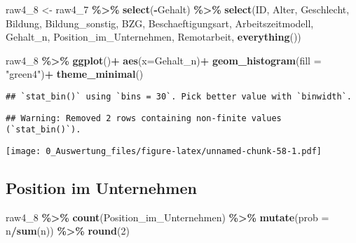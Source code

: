 \documentclass[
]{article}
\newenvironment{Shaded}{\begin{snugshade}}{\end{snugshade}}
\newcommand{\AttributeTok}[1]{\textcolor[rgb]{0.13,0.29,0.53}{#1}}
\newcommand{\DecValTok}[1]{\textcolor[rgb]{0.00,0.00,0.81}{#1}}
\newcommand{\FunctionTok}[1]{\textcolor[rgb]{0.13,0.29,0.53}{\textbf{#1}}}
\newcommand{\NormalTok}[1]{#1}
\newcommand{\OtherTok}[1]{\textcolor[rgb]{0.56,0.35,0.01}{#1}}
\newcommand{\SpecialCharTok}[1]{\textcolor[rgb]{0.81,0.36,0.00}{\textbf{#1}}}
\newcommand{\StringTok}[1]{\textcolor[rgb]{0.31,0.60,0.02}{#1}}
\begin{document}
\begin{Shaded}
\begin{Highlighting}[]
\NormalTok{raw4\_8 }\OtherTok{\textless{}{-}}\NormalTok{ raw4\_7 }\SpecialCharTok{\%\textgreater{}\%} 
  \FunctionTok{select}\NormalTok{(}\SpecialCharTok{{-}}\NormalTok{Gehalt) }\SpecialCharTok{\%\textgreater{}\%} 
  \FunctionTok{select}\NormalTok{(ID, Alter, Geschlecht, Bildung, Bildung\_sonstig, BZG, Beschaeftigungsart, Arbeitszeitmodell, Gehalt\_n, Position\_im\_Unternehmen, Remotarbeit, }\FunctionTok{everything}\NormalTok{())}
\end{Highlighting}
\end{Shaded}

\begin{Shaded}
\begin{Highlighting}[]
\NormalTok{raw4\_8 }\SpecialCharTok{\%\textgreater{}\%} 
  \FunctionTok{ggplot}\NormalTok{()}\SpecialCharTok{+}
  \FunctionTok{aes}\NormalTok{(}\AttributeTok{x=}\NormalTok{Gehalt\_n)}\SpecialCharTok{+}
  \FunctionTok{geom\_histogram}\NormalTok{(}\AttributeTok{fill =} \StringTok{"green4"}\NormalTok{)}\SpecialCharTok{+}
  \FunctionTok{theme\_minimal}\NormalTok{()}
\end{Highlighting}
\end{Shaded}

\begin{verbatim}
## `stat_bin()` using `bins = 30`. Pick better value with `binwidth`.
\end{verbatim}

\begin{verbatim}
## Warning: Removed 2 rows containing non-finite values (`stat_bin()`).
\end{verbatim}

\texttt{[image: 0\_Auswertung\_files/figure-latex/unnamed-chunk-58-1.pdf]}

\subsection{Position im Unternehmen}\label{position-im-unternehmen}

\begin{Shaded}
\begin{Highlighting}[]
\NormalTok{raw4\_8 }\SpecialCharTok{\%\textgreater{}\%} 
  \FunctionTok{count}\NormalTok{(Position\_im\_Unternehmen) }\SpecialCharTok{\%\textgreater{}\%} 
  \FunctionTok{mutate}\NormalTok{(}\AttributeTok{prob =}\NormalTok{ n}\SpecialCharTok{/}\FunctionTok{sum}\NormalTok{(n)) }\SpecialCharTok{\%\textgreater{}\%} 
  \FunctionTok{round}\NormalTok{(}\DecValTok{2}\NormalTok{)}
\end{Highlighting}
\end{Shaded}
\end{document}
